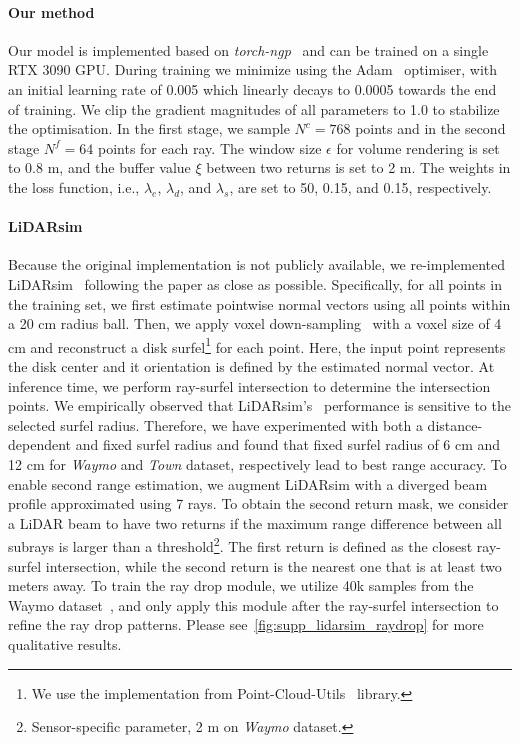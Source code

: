 \paragraph{Our method}
Our model is implemented based on \emph{torch-ngp}~\cite{torch-ngp,mueller2022instant} and can be trained on a single RTX 3090 GPU. During training we minimize  using the Adam~\cite{kingma2014adam} optimiser, with an initial learning rate of 0.005 which linearly decays to 0.0005 towards the end of training. We clip the gradient magnitudes of all parameters to 1.0 to stabilize the optimisation. In the first stage, we sample $N^c = 768$ points and in the second stage $N^f=64$ points for each ray. The window size $\epsilon$ for volume rendering is set to 0.8 m, and the buffer value $\xi$ between two returns is set to 2 m. The weights in the loss function, i.e., $\lambda_e$, $\lambda_d$, and $\lambda_s$, are set to 50, 0.15, and 0.15, respectively.



\paragraph{LiDARsim}
Because the original implementation is not publicly available, we re-implemented LiDARsim~\cite{manivasagam2020lidarsim} following the paper as close as possible. Specifically, for all points in the training set, we first estimate pointwise normal vectors using all points within a 20 cm radius ball. Then, we apply voxel down-sampling~\cite{tang2022torchsparse} with a voxel size of 4 cm and reconstruct a disk surfel\footnote{We use the implementation from Point-Cloud-Utils~\cite{point-cloud-utils} library.} for each point. Here, the input point represents the disk center and it orientation is defined by the estimated normal vector. At inference time, we perform ray-surfel intersection to determine the intersection points. We empirically observed that LiDARsim's~\cite{manivasagam2020lidarsim} performance is sensitive to the selected surfel radius. Therefore, we have experimented with both a distance-dependent and fixed surfel radius and found that fixed surfel radius of 6 cm and 12 cm for \textit{Waymo} and \textit{Town} dataset, respectively lead to best range accuracy. To enable second range estimation, we augment LiDARsim with a diverged beam profile approximated using 7 rays. To obtain the second return mask, we consider a LiDAR beam to have two returns if the maximum range difference between all subrays is larger than a threshold\footnote{Sensor-specific parameter, 2 m on \textit{Waymo} dataset.}. The first return is defined as the closest ray-surfel intersection, while the second return is the nearest one that is at least two meters away. To train the ray drop module, we utilize 40k samples from the Waymo dataset~\cite{sun2020scalability}, and only apply this module after the ray-surfel intersection to refine the ray drop patterns. Please see~\cref{fig:supp_lidarsim_raydrop} for more qualitative results. 


